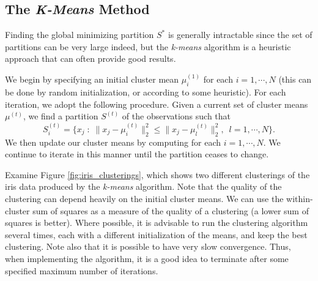 \subsection*{The \emph{K-Means} Method}
Finding the global minimizing partition $S^*$ is generally intractable since the set of partitions can be very large indeed, 
but the \emph{k-means} algorithm is a heuristic approach that can often provide good results.


We begin by specifying an initial cluster mean $\mu_i^{(1)}$ for each $i = 1, \cdots, N$ (this can be done by random initialization, or according to some heuristic).
For each iteration, we adopt the following procedure. 
Given a current set of cluster means $\mu^{(t)}$, we find a partition $S^{(t)}$ of the observations such that
\begin{equation*}
S_{i}^{(t)} = \{x_j \; : \; \|x_j - \mu_{i}^{(t)}\|_2^2 \leq \|x_j - \mu_{l}^{(t)}\|_2^2,\,\,\,  l = 1, \cdots, N\}.
\end{equation*}
We then update our cluster means by computing for each $i = 1, \cdots, N$.
We continue to iterate in this manner until the partition ceases to change. 



Examine Figure \ref{fig:iris_clusterings}, which shows two different clusterings of the iris data produced by the \emph{k-means} algorithm.
Note that the quality of the clustering can depend heavily on the initial cluster means.
We can use the within-cluster sum of squares as a measure of the quality of a clustering (a lower sum of squares is better).
Where possible, it is advisable to run the clustering algorithm several times, each with a different initialization of the means,
and keep the best clustering. 
Note also that it is possible to have very slow convergence.
Thus, when implementing the algorithm, it is a good idea to terminate after some specified maximum number of iterations.

